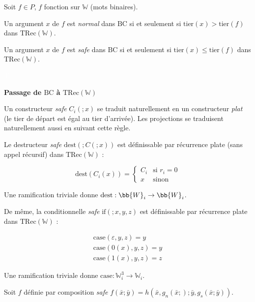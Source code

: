 \documentclass{report}
\newcommand{\TRec}[1]{\text{TRec}\left(\mathbb{#1}\right)}
\begin{document}
		\begin{lemma}
			\label{lem:BC_and_Leivant}
			Soit $f \in P$, $f$ fonction sur $\mathbb{W}$ (mots binaires).
			
			Un argument $x$ de $f$ est \emph{normal} dans $\text{BC}$ si et seulement si $\text{tier}(x) > \text{tier}(f)$ dans $\TRec{W}$.
			
			Un argument $x$ de $f$ est \emph{safe} dans $\text{BC}$ si et seulement si $\text{tier}(x) \leq \text{tier}(f)$ dans $\TRec{W}$.
		\end{lemma}
		
		\begin{demo}
			\textcolor{white}{T} %
			
			\textbf{Passage de $\text{BC}$ à $\TRec{W}$}
			
			Un constructeur \emph{safe} $C_i(; x)$ se traduit naturellement en un constructeur \emph{plat} (le tier de départ est égal au tier d'arrivée). Les projections se traduisent naturellement aussi en suivant cette règle.
			
			Le destructeur \emph{safe} $\text{dest} \left( ; C\left(; x\right) \right)$ est définissable par récurrence plate (sans appel récursif) dans $\TRec{W}$ : 
			
			\[
				\text{dest} \left( C_i\left( x\right) \right) = 
				\left\lbrace \begin{array}{ll}
				C_i	& \text{si $r_i = 0$} \\
				x	& \text{sinon}
				\end{array} \right.
			\]
			
			Une ramification triviale donne $\text{dest} : \bb{W}_i \to \bb{W}_i$.
			
			De même, la conditionnelle \emph{safe} $\text{if} \left( ; x, y, z\right)$ est définissable par récurrence plate dans $\TRec{W}$ : 
			
			\[
				\begin{array}{l}
				\text{case}(\varepsilon, y, z) = y \\
				\text{case}(0(x), y, z) = y \\
				\text{case}(1(x), y, z) = z
				\end{array}
			\]
			
			Une ramification triviale donne $\text{case} : \mathbb{W}_i^3 \to \mathbb{W}_i$.
			
			Soit $f$ définie par composition \emph{safe} $f\left( \bar{x} ; \bar{y}\right) = h\left( \bar{x}, g_n( \bar{x}; ) ; \bar{y}, g_s( \bar{x}; \bar{y} ) \right)$.
			

\end{demo}
\end{document}
